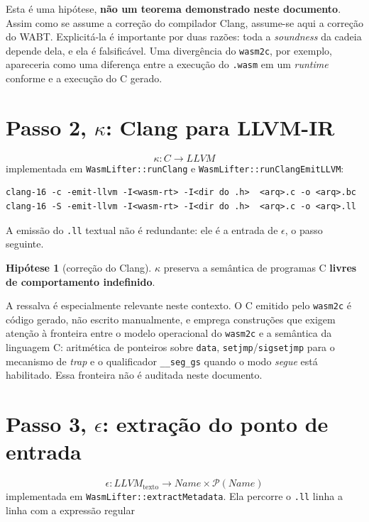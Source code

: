 \documentclass[11pt,a4paper]{article}
\theoremstyle{definition}
\newtheorem{hipotese}{Hipótese}
\newcommand{\code}[1]{\texttt{#1}}
\begin{document}
Esta é uma hipótese,
\textbf{não um teorema demonstrado neste documento}. Assim como se assume a
correção do compilador Clang, assume-se aqui a correção do WABT. Explicitá-la é
importante por duas razões: toda a \emph{soundness} da cadeia depende dela, e
ela é falsificável. Uma divergência do \code{wasm2c}, por exemplo, apareceria
como uma diferença entre a execução do \code{.wasm} em um \emph{runtime}
conforme e a execução do C gerado.

\section{Passo 2, $\kappa$: Clang para LLVM-IR}
\label{sec:kappa}

\[
  \kappa : \mathit{C} \longrightarrow \mathit{LLVM}
\]
implementada em \code{WasmLifter::runClang} e \code{WasmLifter::runClangEmitLLVM}:

\begin{lstlisting}
clang-16 -c -emit-llvm -I<wasm-rt> -I<dir do .h>  <arq>.c -o <arq>.bc
clang-16 -S -emit-llvm -I<wasm-rt> -I<dir do .h>  <arq>.c -o <arq>.ll
\end{lstlisting}

A emissão do \code{.ll} textual não é redundante: ele é a entrada de $\epsilon$,
o passo seguinte.

\begin{hipotese}[correção do Clang]\label{hip:clang}
$\kappa$ preserva a semântica de programas C \textbf{livres de comportamento
indefinido}.
\end{hipotese}

A ressalva é especialmente relevante neste contexto. O C emitido
pelo \code{wasm2c} é código gerado, não escrito manualmente, e emprega
construções que exigem atenção à fronteira entre o modelo operacional do
\code{wasm2c} e a semântica da linguagem C: aritmética de ponteiros sobre
\code{data}, \code{setjmp}/\code{sigsetjmp} para o mecanismo de \emph{trap} e o
qualificador \code{\_\_seg\_gs} quando o modo \emph{segue} está habilitado. Essa
fronteira não é auditada neste documento.

\section{Passo 3, $\epsilon$: extração do ponto de entrada}

\[
  \epsilon : \mathit{LLVM}_{\text{texto}} \longrightarrow
             \mathit{Name} \times \mathcal{P}(\mathit{Name})
\]
implementada em \code{WasmLifter::extractMetadata}. Ela percorre o \code{.ll}
linha a linha com a expressão regular
\end{document}
